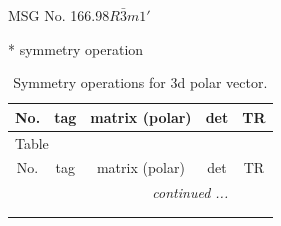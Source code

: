 \documentclass[fleqn,8pt]{jsarticle}
\begin{document}
\setcounter{MaxMatrixCols}{32}

\renewcommand{\tablename}{Table~}
\renewcommand{\figurename}{Figure~}
\begin{center}
\LARGE
MSG No. 166.98\quad$R\bar{3}m1'$
\end{center}
* symmetry operation
\renewcommand{\arraystretch}{1.3}
\begin{longtable}{ccccc}
\caption{Symmetry operations for 3d polar vector.}
 \\
 \hline \hline
No. & tag & matrix (polar) & det & TR \\ \hline \endfirsthead

\multicolumn{4}{l}{\tablename\ \thetable{}} \\
 \hline \hline
No. & tag & matrix (polar) & det & TR \\ \hline \endhead

 \hline \hline
\multicolumn{4}{r}{\footnotesize\it continued ...} \\ \endfoot

 \hline \hline
\multicolumn{4}{r}{} \\ \endlastfoot


\end{longtable}
\end{document}
